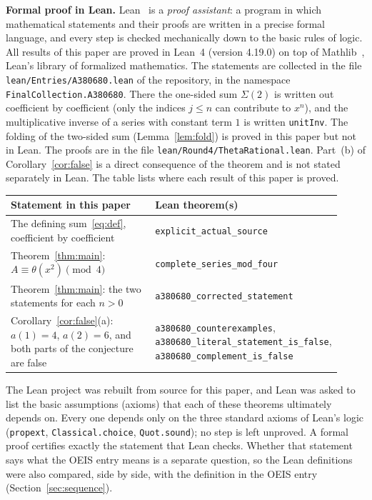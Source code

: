 \documentclass[11pt,a4paper]{article}
\theoremstyle{definition}
\theoremstyle{remark}
\newcommand{\para}[1]{\par\medskip\noindent\textbf{#1}\enspace}
\begin{document}
\para{Formal proof in Lean.}
Lean~\cite{lean} is a \emph{proof assistant}: a program in which mathematical statements and their proofs are written
in a precise formal language, and every step is checked mechanically down to the basic rules of logic. All results of
this paper are proved in Lean~4 (version 4.19.0) on top of Mathlib~\cite{mathlib}, Lean's library of formalized
mathematics. The statements are collected in the file \texttt{lean/Entries/A380680.lean} of the repository,
in the namespace \texttt{FinalCollection.A380680}. There the one-sided sum $\Sigma(2)$ is written out coefficient by coefficient (only the indices $j\le n$ can contribute to $x^n$), and the multiplicative inverse of a series with constant term $1$ is written \texttt{unitInv}. The folding of the two-sided sum (Lemma~\ref{lem:fold}) is proved in this paper but not in Lean. The proofs are in the file \texttt{lean/Round4/ThetaRational.lean}. Part~(b) of Corollary~\ref{cor:false} is a direct consequence of the theorem and is not stated separately in Lean.
The table lists where each result of this paper is proved.
\begin{center}\small\renewcommand{\arraystretch}{1.25}
\begin{tabular}{>{\raggedright\arraybackslash}p{0.52\linewidth}>{\raggedright\arraybackslash}p{0.4\linewidth}}
\toprule
Statement in this paper & Lean theorem(s)\\
\midrule
The defining sum~\eqref{eq:def}, coefficient by coefficient & \texttt{explicit\_\allowbreak{}actual\_\allowbreak{}source} \\
Theorem~\ref{thm:main}: $A\equiv\theta(x^2)\pmod4$ & \texttt{complete\_\allowbreak{}series\_\allowbreak{}mod\_\allowbreak{}four} \\
Theorem~\ref{thm:main}: the two statements for each $n>0$ & \texttt{a380680\_\allowbreak{}corrected\_\allowbreak{}statement} \\
Corollary~\ref{cor:false}(a): $a(1)=4$, $a(2)=6$, and both parts of the conjecture are false & \texttt{a380680\_\allowbreak{}counterexamples}, \texttt{a380680\_\allowbreak{}literal\_\allowbreak{}statement\_\allowbreak{}is\_\allowbreak{}false}, \texttt{a380680\_\allowbreak{}complement\_\allowbreak{}is\_\allowbreak{}false} \\
\bottomrule
\end{tabular}
\end{center}
The Lean project was rebuilt from source for this paper, and Lean was asked to list the basic assumptions (axioms)
that each of these theorems ultimately depends on. Every one depends only on the three standard axioms of Lean's logic
(\texttt{propext}, \texttt{Classical.choice}, \texttt{Quot.sound}); no step is left unproved. A formal proof certifies
exactly the statement that Lean checks. Whether that statement says what the OEIS entry means is a separate question,
so the Lean definitions were also compared, side by side, with the definition in the OEIS entry
(Section~\ref{sec:sequence}).
\end{document}
